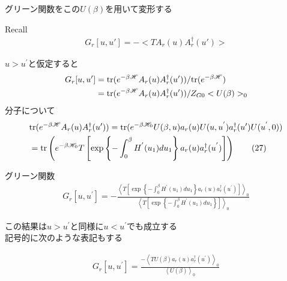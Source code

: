 \documentclass[dvipdfmx,10pt]{beamer}
\begin{document}
\begin{frame}
    グリーン関数をこの$U(\beta)$を用いて変形する
    \begin{block}{Recall}
        \begin{align}
            G_r[u,u'] = -<TA_r(u)A_r^{\dagger}(u')> \tag{1}
        \end{align}
    \end{block}
    $u>u^{'}$と仮定すると
    \begin{align*}
        G_r[u,u'] &= {\rm tr}(e^{-\beta\mathscr{H}}A_r(u)A_r^{\dagger}(u'))/{\rm tr}(e^{-\beta\mathscr{H}})\nonumber\\
        &= {\rm tr}(e^{-\beta\mathscr{H}}A_r(u)A_r^{\dagger}(u'))/Z_{G0}<U(\beta)>_0 \nonumber
    \end{align*}
    分子について
    \begin{align*}
        &{\rm tr}(e^{-\beta\mathscr{H}}A_r(u)A_r^{\dagger}(u')) = {\rm tr}(e^{-\beta\mathscr{H}_0}U(\beta,u)a_r(u)U(u,u^{'})a_r^{\dagger}(u')U(u^{'},0)) \nonumber\\
        &= {\rm tr}\left(e^{-\beta\mathscr{H}_0}T\left[\exp\left\{-\int_0^{\beta}H^{'}(u_1)du_1\right\}a_r(u)a_r^{\dagger}(u^{'})\right]\right) \tag{27}
    \end{align*}
\end{frame}
\begin{frame}
    \begin{block}{グリーン関数}
        \begin{align*}
            G_r[u,u^{'}] = -\frac{\left<T\left[\exp\left\{-\int_0^{\beta}H^{'}(u_1)du_1\right\}a_r(u)a_r^{\dagger}(u^{'})\right]\right>_0}{\left<T\left[\exp\left\{-\int_0^{\beta}H^{'}(u_1)du_1\right\}\right]\right>_0} \tag{28}
        \end{align*}
    \end{block}
    この結果は$u>u^{'}$と同様に$u<u^{'}$でも成立する\\
    記号的に次のような表記もする
    \begin{block}{}
        \begin{align*}
            G_r[u,u^{'}] = \frac{-\left<TU(\beta)a_r(u)a_r^{\dagger}(u^{'})\right>_0}{\left<U(\beta)\right>_0} \tag{29}
        \end{align*}
    \end{block}
\end{frame}


\end{document}
